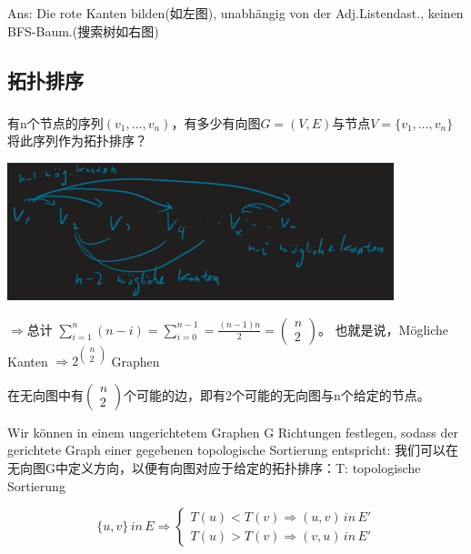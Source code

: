 \documentclass[a4paper]{article}    %
\begin{document}
Ans: Die rote Kanten bilden(如左图), unabhängig von der Adj.Listendast., keinen BFS-Baum.(搜索树如右图)


\subsection{拓扑排序}

\subsubsection{} 有n个节点的序列$(v_1,...,v_n)$，有多少有向图$G=(V,E)$与节点$V=\{v_1,...,v_n\}$将此序列作为拓扑排序？

\begin{center}
    \includegraphics[scale=0.6]{7.png}
\end{center}

$\Rightarrow$总计
$\sum^n_{i=1}(n-i) = \sum^{n-1}_{i=0}=\frac{(n-1)n}{2}=\begin{pmatrix}n\\2 \end{pmatrix}$。
也就是说，Mögliche Kanten $\Rightarrow 2^{\begin{pmatrix}n\\2 \end{pmatrix}}$ Graphen

在无向图中有$\begin{pmatrix}n\\2 \end{pmatrix}$个可能的边，即有2个可能的无向图与n个给定的节点。

Wir können in einem ungerichtetem Graphen G Richtungen festlegen, sodass der gerichtete Graph einer gegebenen topologische Sortierung entspricht:
我们可以在无向图G中定义方向，以便有向图对应于给定的拓扑排序：T: topologische Sortierung


\begin{equation}
    \{u,v\}\, in\, E \Rightarrow \left\{
        \begin{array}{lr}
            T(u) < T(v) \Rightarrow (u,v)\, in\, E'\\
            T(u) > T(v) \Rightarrow (v,u)\, in\, E'
        \end{array}
    \right.
\end{equation}
\end{document}
